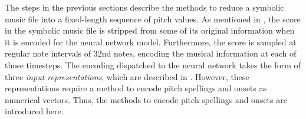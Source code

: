 
The steps in the previous sections describe the methods to
reduce a symbolic music file into a fixed-length sequence of
pitch values. As mentioned in
, the score in the symbolic
music file is stripped from some of its original information
when it is encoded for the neural network model.
Furthermore, the score is sampled at regular note intervals
of \gls{32nd} notes, encoding the musical information at
each of those timesteps. The encoding dispatched to the
neural network takes the form of three \emph{input
representations}, which are described in
. However, these
representations require a method to encode pitch spellings
and onsets as numerical vectors. Thus, the methods to encode
pitch spellings and onsets are introduced here.
